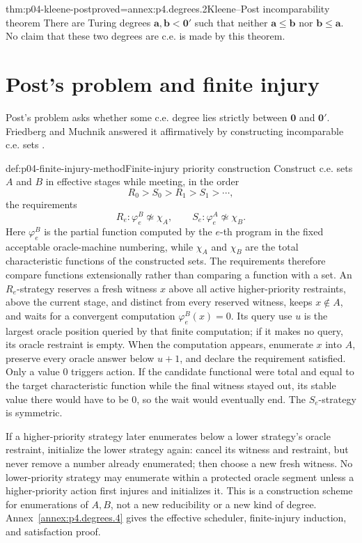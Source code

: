 \begin{hbtheorem}{thm:p04-kleene-post}{proved=annex:p4.degrees.2}{Kleene--Post incomparability theorem}
There are Turing degrees \(\mathbf a,\mathbf b<\mathbf0'\) such that neither
\(\mathbf a\leq\mathbf b\) nor \(\mathbf b\leq\mathbf a\).  No claim that
these two degrees are c.e. is made by this theorem.
\end{hbtheorem}

\section{Post's problem and finite injury}
\label{sec:p04-finite-injury}

Post's problem asks whether some c.e. degree lies strictly between
\(\mathbf0\) and \(\mathbf0'\).  Friedberg and Muchnik answered it
affirmatively by constructing incomparable c.e. sets
\cite{Friedberg1957,Muchnik1956}.

\begin{hbmethod}{def:p04-finite-injury-method}{Finite-injury priority construction}
Construct c.e. sets \(A\) and \(B\) in effective stages while meeting, in the
order
\[
 R_0>S_0>R_1>S_1>\cdots,
\]
the requirements
\[
 R_e:\varphi_e^B\not\simeq\chi_A,
 \qquad
 S_e:\varphi_e^A\not\simeq\chi_B.
\]
Here \(\varphi_e^B\) is the partial function computed by the \(e\)-th
program in the fixed acceptable oracle-machine numbering, while
\(\chi_A\) and \(\chi_B\) are the total
characteristic functions of the constructed sets.  The requirements therefore
compare functions extensionally rather than comparing a function with a set.
An \(R_e\)-strategy reserves a fresh witness \(x\) above all active
higher-priority restraints, above the current stage, and distinct from every reserved witness, keeps
\(x\notin A\), and waits for a convergent computation
\(\varphi_e^B(x)=0\).  Its query use \(u\) is the largest oracle position
queried by that finite computation; if it makes no query, its oracle restraint
is empty.  When the computation appears, enumerate \(x\) into \(A\), preserve
every oracle answer below \(u+1\), and declare the requirement satisfied.
Only a value \(0\) triggers action.  If the candidate functional were total
and equal to the target characteristic function while the final witness stayed
out, its stable value there would have to be \(0\), so the wait would
eventually end.  The
\(S_e\)-strategy is symmetric.

If a higher-priority strategy later enumerates below a lower strategy's
oracle restraint, initialize the lower strategy again: cancel its witness and
restraint, but never remove a number already enumerated; then choose a new
fresh witness.  No lower-priority strategy may enumerate within a protected
oracle segment unless a higher-priority action first injures and initializes
it.  This is a construction scheme for enumerations of \(A,B\), not a new
reducibility or a new kind of degree.  Annex~\ref{annex:p4.degrees.4} gives
the effective scheduler, finite-injury induction, and satisfaction proof.
\end{hbmethod}

